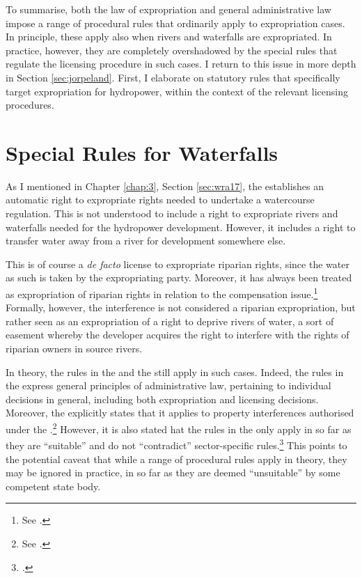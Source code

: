 To summarise, both the law of expropriation and general administrative law impose a range of procedural rules that ordinarily apply to expropriation cases. In principle, these apply also when rivers and waterfalls are expropriated. In practice, however, they are completely overshadowed by the special rules that regulate the licensing procedure in such cases. I return to this issue in more depth in Section \ref{sec:jorpeland}. First, I elaborate on statutory rules that specifically target expropriation for hydropower, within the context of the relevant licensing procedures.

\section{Special Rules for Waterfalls}\label{sec:special}

As I mentioned in Chapter \ref{chap:3}, Section \ref{sec:wra17}, the \cite{wra17} establishes an automatic right to expropriate rights needed to undertake a watercourse regulation. This is not understood to include a right to expropriate rivers and waterfalls needed for the hydropower development. However, it includes a right to transfer water away from a river for development somewhere else. 

This is of course a {\it de facto} license to expropriate riparian rights, since the water as such is taken by the expropriating party. Moreover, it has always been treated as expropriation of riparian rights in relation to the compensation issue.\footnote{See \cite{jorpeland11}.} Formally, however, the interference is not considered a riparian expropriation, but rather seen as an expropriation of a right to deprive rivers of water, a sort of easement whereby the developer acquires the right to interfere with the rights of riparian owners in source rivers.

In theory, the rules in the \cite{ea59} and the \cite{paa67} still apply in such cases. Indeed, the rules in the \cite{paa67} express general principles of administrative law, pertaining to individual decisions in general, including both expropriation and  licensing decisions. Moreover, the \cite{ea59} explicitly states that it applies to property interferences authorised under the \cite{wra17}.\footnote{See \cite[30]{ea59}.} However, it is also stated hat the rules in the \cite{ea59} only apply in so far as they are ``suitable'' and do not ``contradict'' sector-specific rules.\footcite[30]{ea59} This points to the potential caveat that while a range of procedural rules apply in theory, they may be ignored in practice, in so far as they are deemed ``unsuitable'' by some competent state body.

